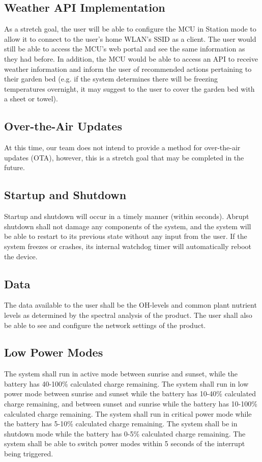 \subsection{Weather API Implementation}
As a stretch goal, the user will be able to configure the MCU in Station mode to allow it to connect to the user's home WLAN's SSID as a client. The user would still be able to access the MCU's web portal and see the same information as they had before. In addition, the MCU would be able to access an API to receive weather information and inform the user of recommended actions pertaining to their garden bed (e.g. if the system determines there will be freezing temperatures overnight, it may suggest to the user to cover the garden bed with a sheet or towel).

\subsection{Over-the-Air Updates}
At this time, our team does not intend to provide a method for over-the-air
updates (OTA), however, this is a stretch goal that may be completed in the
future.

\subsection{Startup and Shutdown} Startup and shutdown will occur in a timely manner (within seconds). Abrupt shutdown shall not damage any components of the system, and the system will be able to restart to its previous state without any input from the user. If the system freezes or crashes, its internal watchdog timer will automatically reboot the device.

\subsection{Data} The data available to the user shall be the OH-levels and common plant nutrient levels as determined by the spectral analysis of the product. The user shall also be able to see and configure the network settings of the product.

\subsection{Low Power Modes} The system shall run in active mode between sunrise and sunset, while the battery has 40-100\% calculated charge remaining. The system shall run in low power mode between sunrise and sunset while the battery has 10-40\% calculated charge remaining, and between sunset and sunrise while the battery has 10-100\% calculated charge remaining. The system shall run in critical power mode while the battery has 5-10\% calculated charge remaining. The system shall be in shutdown mode while the battery has 0-5\% calculated charge remaining. The system shall be able to switch power modes within 5 seconds of the interrupt being triggered.

